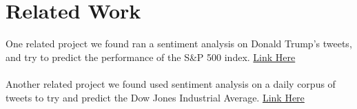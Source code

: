 \documentclass[12pt, notitlepage]{article}
\begin{document}
\section{Related Work}
One related project we found ran a sentiment analysis on Donald Trump's tweets, and try to predict the performance of the S\&P 500 index. \href{https://towardsdatascience.com/covfefe-nlp-do-trumps-tweets-move-the-stock-market-42a83ab17fea}{Link Here}\\\\
Another related project we found used sentiment analysis on a daily corpus of tweets to try and predict the Dow Jones Industrial Average. \href{http://cs229.stanford.edu/proj2011/GoelMittal-StockMarketPredictionUsingTwitterSentimentAnalysis.pdf}{Link Here}
\end{document}
